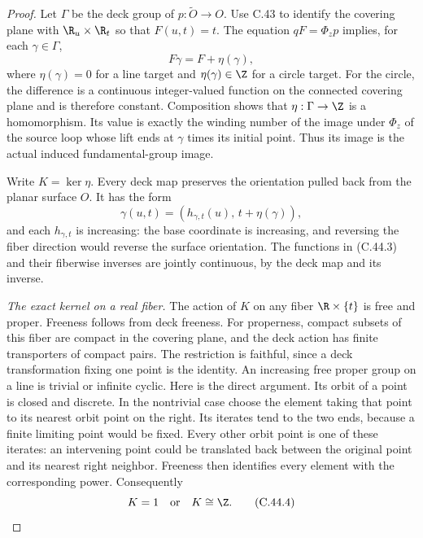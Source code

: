 \begin{proof}
Let $\Gamma$ be the deck group of
$p:\widetilde O\to O$.
Use C.43 to identify the covering plane
with $\R_u\times\R_t$ so that $F(u,t)=t$.
The equation $qF=\Phi_zp$ implies, for
each $\gamma\in\Gamma$,
\[
 F\gamma=F+\eta(\gamma),                                \tag{C.44.2}
\]
where $\eta(\gamma)=0$ for a line target
and $\eta(\gamma)\in\Z$ for a circle
target. For the circle, the difference
is a continuous integer-valued function
on the connected covering plane and
is therefore constant. Composition
shows that $\eta:\Gamma\to\Z$ is a
homomorphism. Its value is exactly the
winding number of the image under
$\Phi_z$ of the source loop whose lift
ends at $\gamma$ times its initial
point. Thus its image is the actual
induced fundamental-group image.

Write $K=\ker\eta$. Every deck map
preserves the orientation pulled back
from the planar surface $O$. It has
the form
\[
 \gamma(u,t)=
       (h_{\gamma,t}(u),\,t+\eta(\gamma)),                \tag{C.44.3}
\]
and each $h_{\gamma,t}$ is increasing:
the base coordinate is increasing,
and reversing the fiber direction
would reverse the surface orientation.
The functions in (C.44.3) and their
fiberwise inverses are jointly
continuous, by the deck map and its
inverse.

\emph{The exact kernel on a real fiber.}
The action of $K$ on any fiber
$\R\times\{t\}$ is free and proper.
Freeness follows from deck freeness.
For properness, compact subsets of
this fiber are compact in the
covering plane, and the deck action
has finite transporters of compact
pairs. The restriction is faithful,
since a deck transformation fixing
one point is the identity.
An increasing free proper group on
a line is trivial or infinite cyclic.
Here is the direct argument.
Its orbit of a point is closed and
discrete. In the nontrivial case
choose the element taking that point
to its nearest orbit point on the
right. Its iterates tend to the
two ends, because a finite limiting
point would be fixed. Every other
orbit point is one of these iterates:
an intervening point could be
translated back between the original
point and its nearest right neighbor.
Freeness then identifies every
element with the corresponding power.
Consequently
\[
                          K=1\quad\hbox{or}\quad K\cong\Z.
                                                               \tag{C.44.4}
\]


\end{proof}
